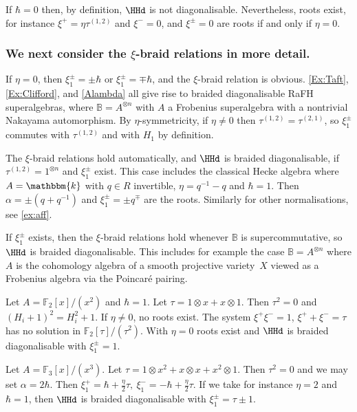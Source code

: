 \documentclass[a4paper,11pt]{amsart}
\numberwithin{equation}{subsection}
\theoremstyle{definition}
\theoremstyle{theorem}
\theoremstyle{remark}
\newcommand\taui[1][i]{\tau^{(#1)}}
\newcommand\F{\mathbb{F}}
\newcommand\kk{\mathbbm{k}}
\newcommand{\Bo}{\mathbb{B}}
\begin{document}
 \begin{Remark}
   If $\hbar=0$ then, by definition, $\HHd$ is not diagonalisable. Nevertheless, roots exist, for instance $\xi^+=\eta\taui[1,2]$ and $\xi^-=0$, and $\xi^\pm=0$ are roots if and only if $\eta=0$.
    \end{Remark}

\subsubsection*{We next consider the  $\xi$-braid relations in more detail.}
\begin{Remark}\label{obvious}
   If $\eta=0$, then $\xi^\pm_1=\pm\hbar$ or $\xi^\pm_1=\mp\hbar$,  and the $\xi$-braid
    relation is obvious.  \autoref{Ex:Taft}, \autoref{Ex:Clifford}, and \autoref{Alambda} all give rise to braided
  diagonalisable RaFH superalgebras, where $\Bo=A^{\otimes n}$ with $A$ a
  Frobenius superalgebra with a nontrivial Nakayama automorphism. By $\eta$-symmetricity, if $\eta\not=0$ then
    $\tau^{(1,2)}=\tau^{(2,1)}$, so $\xi_1^\pm$ commutes with $\taui[1,2]$
    and with $H_1$ by definition.
\end{Remark}

\begin{Example} The $\xi$-braid relations hold automatically, and $\HHd$ is braided diagonalisable, if $\tau^{(1,2)}=1^{\otimes n}$ and $\xi^\pm_1$ exist.  This
    case includes the classical Hecke algebra where $A=\kk$ with $q\in R$ invertible,
    $\eta=q^{-1}-q$ and $\hbar=1$. Then $\alpha=\pm(q+q^{-1})$ and $\xi^\pm_1=\pm q^{\mp}$ are the roots.
    Similarly for other normalisations, see \autoref{ex:aff}.
\end{Example}

  \begin{Example}
    If $\xi^\pm_1$ exists, then the $\xi$-braid relations hold whenever
    $\Bo$ is supercommutative, so $\HHd$ is braided diagonalisable.
This includes for example the case
    $\Bo=A^{\otimes n}$ where $A$ is the cohomology algebra of a smooth
    projective variety~$X$ viewed as a Frobenius algebra via the Poincar{\'e} pairing.
  \end{Example}


 \begin{Example}
   Let $A=\F_2[x]/(x^2)$ and $\hbar=1$.  Let $\tau=1\otimes x+x\otimes1$. Then $\tau^2=0$ and $(H_i+1)^2=H_i^2+1$. If $\eta\neq0$, no roots exist.  The system $\xi^+\xi^-=1$, $\xi^+ +\xi^-=\tau$ has no solution in $\F_2[\tau]/(\tau^2)$. With $\eta=0$ roots exist and $\HHd$ is
   braided diagonalisable with $\xi_1^\pm=1$.
 \end{Example}
 \begin{Example}
   Let $A=\F_3[x]/(x^3)$.  Let $\tau=1\otimes x^2+x\otimes x+x^2\otimes
   1$. Then $\tau^2=0$ and we may set $\alpha=2\hbar$. Then
   $\xi^+_1=\hbar+\tfrac{\eta}{2}\tau,\ \xi^-_1={-\hbar}+{\tfrac{\eta}{2}}\tau$.
   If we take for instance $\eta=2$ and $\hbar=1$, then $\HHd$ is
   braided diagonalisable with  $\xi^\pm_1=\tau\pm1$.
 \end{Example}
\end{document}
